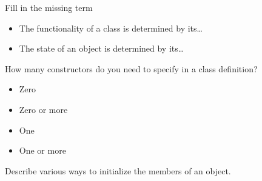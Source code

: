 \begin{review}
  \label{ex:class-review1}
  Fill in the missing term
  \begin{itemize}
  \item The functionality of a class is determined by its\ldots
  \item The state of an object is determined by its\ldots
  \end{itemize}

  How many constructors do you need to specify in a class definition?
  \begin{itemize}
  \item Zero
  \item Zero or more
  \item One
  \item One or more
  \end{itemize}
\end{review}

\begin{review}
  \label{ex:class-review2}
  Describe various ways to initialize the members of an object.
\end{review}

\ifIncludeAnswers
\else
\endinput
\fi

\Level 0 {Homework discussions}

\Level 1 {Square inheritance}
\label{sec:discuss-square}

\begin{multicols}{2}
  \scriptsize
  \lstset{basicstyle=scriptsize}
  
  \lstset{basicstyle=footnotesize}
\end{multicols}

\Level 1 {Goldbach conjecture}
\label{sec:discuss-goldbach}

\begin{multicols}{2}
  \scriptsize
  \lstset{basicstyle=scriptsize}
  
  \lstset{basicstyle=footnotesize}
\end{multicols}

